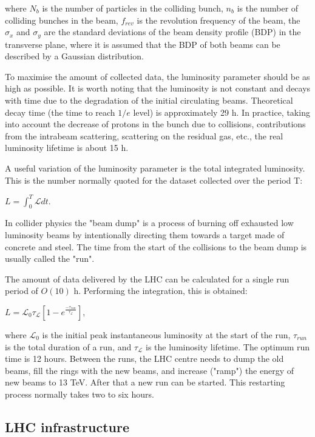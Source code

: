 \begin{normalsize}
\noindent where $N_b$ is the number of particles in the colliding bunch, $n_b$ is the number of colliding bunches in the beam, $f_{rev}$ is the revolution frequency of the beam, the $\sigma_x$ and $\sigma_y$ are the standard deviations of the beam density profile (BDP) in the transverse plane, where it is assumed that the BDP of both beams can be described by a Gaussian distribution.


To maximise the amount of collected data, the luminosity parameter should be as high as possible. It is worth noting that the luminosity is not constant and decays with time due to the degradation of the initial circulating beams. Theoretical decay time (the time to reach $1/e$ level) is approximately 29 h. In practice, taking into account the decrease of protons in the bunch due to collisions, contributions from the intrabeam scattering, scattering on the residual gas, etc., the real luminosity lifetime is about 15 h. 

A useful variation of the luminosity parameter is the total integrated luminosity. This is the number normally quoted for the dataset collected over the period T:

$L = \int_{0}^{T} \mathcal{L}  dt$.

In collider physics the "beam dump" is a process of burning off exhausted low luminosity beams by intentionally directing them towards a target made of concrete and steel. The time from the start of the collisions to the beam dump is usually called the "run".

The amount of data delivered by the LHC can be calculated for a single run period of $O(10)$ h. Performing the integration, this is obtained: 

 $L = \mathcal{L}_0 \tau_\mathcal{L}  \left[  1- e^{\frac{-\tau_{run}}{\tau_\mathcal{L} }}  \right]$, 

\noindent where $\mathcal{L}_0$ is the initial peak instantaneous luminosity at the start of the run, $\tau_{run}$ is the total duration of a run, and $\tau_\mathcal{L}$ is the luminosity lifetime. The optimum run time is 12 hours. Between the runs, the LHC centre needs to dump the old beams, fill the rings with the new beams, and increase ("ramp") the energy of new beams to 13 TeV. After that a new run can be started. This restarting process normally takes two to six hours.



\subsection{LHC infrastructure}


\end{normalsize}
